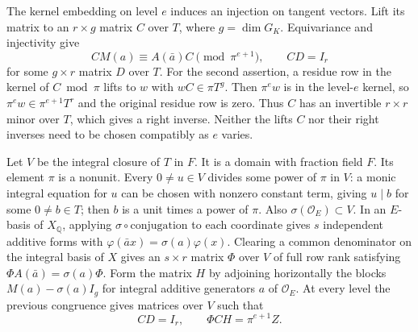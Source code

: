 The kernel embedding on level \(e\) induces an injection on tangent
vectors. Lift its matrix to an \(r\times g\) matrix \(C\) over
\(T\), where \(g=\dim G_K\). Equivariance and injectivity give
\[
   CM(a)\equiv A(\bar a)C\pmod{\pi^{e+1}},
   \qquad CD=I_r
\]
for some \(g\times r\) matrix \(D\) over \(T\). For the second
assertion, a residue row in the kernel of \(C\bmod\pi\) lifts to
\(w\) with \(wC\in\pi T^g\). Then \(\pi^ew\) is in the level-\(e\)
kernel, so \(\pi^ew\in\pi^{e+1}T^r\) and the original residue row
is zero. Thus \(C\) has an invertible \(r\times r\) minor over \(T\),
which gives a right inverse. Neither the lifts \(C\) nor their right
inverses need to be chosen compatibly as \(e\) varies.

Let \(V\) be the integral closure of \(T\) in \(F\).
It is a domain with fraction field \(F\). Its element \(\pi\) is a
nonunit. Every \(0\ne u\in V\) divides some power of \(\pi\) in \(V\):
a monic integral equation for \(u\) can be chosen with nonzero
constant term, giving \(u\mid b\) for some \(0\ne b\in T\);
then \(b\) is a unit times a power of \(\pi\). Also
\(\sigma(\mathcal O_E)\subset V\). In an \(E\)-basis of \(X_{\mathbb Q}\),
applying \(\sigma\circ\text{conjugation}\) to each coordinate gives \(s\)
independent additive forms with
\(\varphi(\bar a x)=\sigma(a)\varphi(x)\). Clearing a common
denominator on the integral basis of \(X\) gives an \(s\times r\)
matrix \(\Phi\) over \(V\) of full row rank satisfying
\(\Phi A(\bar a)=\sigma(a)\Phi\). Form the matrix \(H\) by adjoining
horizontally the blocks \(M(a)-\sigma(a)I_g\) for integral additive
generators \(a\) of \(\mathcal O_E\). At every level the previous
congruence gives matrices over \(V\) such that
\[
    CD=I_r,\qquad \Phi C H=\pi^{e+1}Z .
\]

